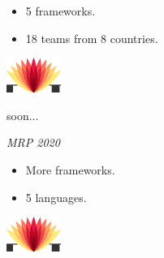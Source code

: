 \documentclass[t,xcolor={svgnames,table}]{beamer}
\begin{document}
\begin{frame}
\begin{minipage}{.6\textwidth}
\begin{itemize}
\item 5 frameworks.
\item 18 teams from 8 countries.
\end{itemize}
\end{minipage}
\hfill
\begin{minipage}{.1\textwidth}
\includegraphics[width=\textwidth]{logo.png}
\end{minipage}

\pause
\vfill

soon...

\textit{MRP 2020}

\begin{minipage}{.6\textwidth}
\begin{itemize}
\item More frameworks.
\item 5 languages.
\end{itemize}
\end{minipage}
\hfill
\begin{minipage}{.1\textwidth}
\includegraphics[width=\textwidth]{logo.png}
\end{minipage}
\end{frame}
\end{document}
